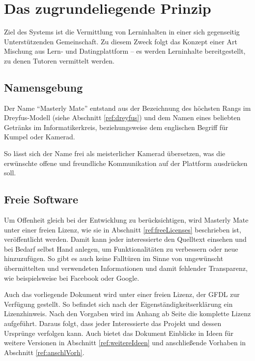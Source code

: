 

\chapter{Das zugrundeliegende Prinzip}
Ziel des Systems ist die Vermittlung von Lerninhalten in einer sich gegenseitig
Unterstützenden Gemeinschaft. Zu diesem Zweck folgt das Konzept einer Art
Mischung aus Lern- und Datingplattform -- es werden Lerninhalte bereitgestellt,
zu denen Tutoren vermittelt werden.

\section{Namensgebung}\label{ref:naming}
Der Name "`Masterly Mate"' entstand aus der Bezeichnung des höchsten Rangs im
Dreyfus-Modell (siehe Abschnitt \ref{ref:dreyfus}) und dem Namen eines
beliebten Getränks im Informatikerkreis, beziehungsweise dem englischen Begriff
für Kumpel oder Kamerad.

So lässt sich der Name frei als meisterlicher Kamerad übersetzen, was die
erwünschte offene und freundliche Kommunikation auf der Plattform ausdrücken
soll.

\section{Freie Software}\label{ref:freeLicensesConcept}
Um Offenheit gleich bei der Entwicklung zu berücksichtigen, wird Masterly Mate
unter einer freien Lizenz, wie sie in Abschnitt \ref{ref:freeLicenses}
beschrieben ist, veröffentlicht werden. Damit kann jeder interessierte den
Quelltext einsehen und bei Bedarf selbst Hand anlegen, um Funktionalitäten zu
verbessern oder neue hinzuzufügen. So gibt es auch keine Falltüren im Sinne von
ungewünscht übermittelten und verwendeten Informationen und damit fehlender
Transparenz, wie beispielsweise bei Facebook oder Google.

Auch das vorliegende Dokument wird unter einer freien Lizenz, der \ac{GFDL} zur
Verfügung gestellt. So befindet sich nach der Eigenständigkeitserklärung ein
Lizenzhinweis. Nach den Vorgaben wird im Anhang ab Seite \pageref{ref:gfdl} die
komplette Lizenz aufgeführt. Daraus folgt, dass jeder Interessierte das Projekt
und dessen Ursprünge verfolgen kann. Auch bietet das Dokument Einblicke in Ideen
für weitere Versionen in Abschnitt \ref{ref:weitereIdeen} und anschließende
Vorhaben in Abschnitt \ref{ref:anschlVorh}.


